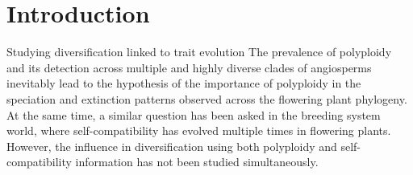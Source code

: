 \section{Introduction}


%


Studying diversification linked to trait evolution\newline
The prevalence of polyploidy and its detection across multiple and highly diverse clades of angiosperms inevitably lead to the hypothesis of the importance of polyploidy in the speciation and extinction patterns observed across the flowering plant phylogeny. 
At the same time, a similar question has been asked in the breeding system world, where self-compatibility has evolved multiple times in flowering plants. 
However, the influence in diversification using both polyploidy and self-compatibility information has not been studied simultaneously.

